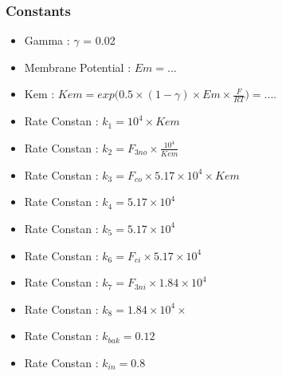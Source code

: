 \newpage
\subsubsection{Constants}

\begin{itemize}
\item Gamma : $\gamma$ = 0.02
\item Membrane Potential : $Em =... $
\item Kem : $Kem = exp{(0.5\times(1-\gamma)\times Em \times \frac{F}{RT}}) = ....$
\item Rate Constan : $k_{1} = 10^{4} \times Kem$
\item Rate Constan : $k_{2} = F_{3no} \times \frac{10^{4}}{Kem}$
\item Rate Constan : $k_{3} = F_{co} \times 5.17 \times 10^{4} \times Kem$
\item Rate Constan : $k_{4} = 5.17 \times 10^{4}$
\item Rate Constan : $k_{5} = 5.17 \times 10^{4}$
\item Rate Constan : $k_{6} = F_{ci} \times 5.17 \times 10^{4} $
\item Rate Constan : $k_{7} = F_{3ni} \times 1.84 \times 10^{4}$
\item Rate Constan : $k_{8} = 1.84 \times 10^{4} \times$
\item Rate Constan : $k_{bak} = 0.12 $
\item Rate Constan : $k_{in} = 0.8$
\end{itemize}






